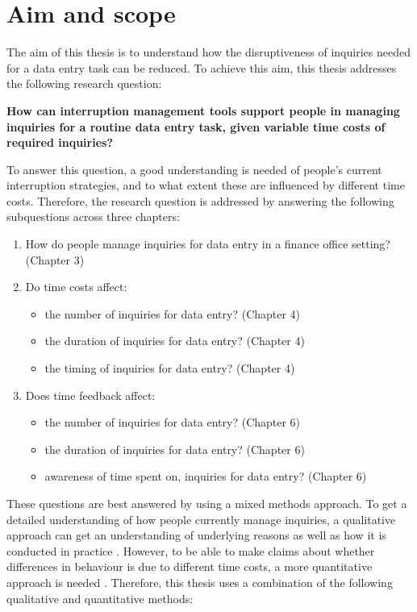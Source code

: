 \section{Aim and scope}
The aim of this thesis is to understand how the disruptiveness of inquiries needed for a data entry task can be reduced. To achieve this aim, this thesis addresses the following research question:

\textbf{How can interruption management tools support people in managing inquiries for a routine data entry task, given variable time costs of required inquiries?}

To answer this question, a good understanding is needed of people's current interruption strategies, and to what extent these are influenced by different time costs. Therefore, the research question is addressed by answering the following subquestions across three chapters:

\begin{enumerate}
\item How do people manage inquiries for data entry in a finance office setting? (Chapter 3)
\item Do time costs affect:
\begin{itemize}
\item the number of inquiries for data entry? (Chapter 4)
\item the duration of inquiries for data entry? (Chapter 4)
\item the timing of inquiries for data entry?  (Chapter 4)
\end{itemize}
\item Does time feedback affect:
\begin{itemize}
\item the number of inquiries for data entry? (Chapter 6)
\item the duration of inquiries for data entry? (Chapter 6)
\item awareness of time spent on, inquiries for data entry? (Chapter 6)
\end{itemize}
\end{enumerate}

These questions are best answered by using a mixed methods approach. To get a detailed understanding of how people currently manage inquiries, a qualitative approach can get an understanding of underlying reasons as well as how it is conducted in practice \citep{Blandford2016}. However, to be able to make claims about whether differences in behaviour is due to different time costs, a more quantitative approach is needed \citep{Cairns2008}.  
Therefore, this thesis uses a combination of the following qualitative and quantitative methods:

